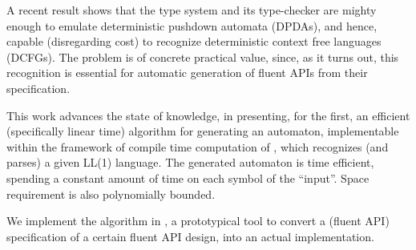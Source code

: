 
A recent result shows that the  type system and its type-checker are
mighty enough to emulate deterministic pushdown automata (DPDAs), and hence,
capable (disregarding cost) to recognize deterministic context free
languages (DCFGs). The problem is of concrete practical value, since, as it
turns out, this recognition is essential for automatic generation of fluent
APIs from their specification. 

This work advances the state of knowledge, in presenting,  for the first,  an
efficient (specifically linear time) algorithm for generating an automaton, 
implementable within the framework of compile time computation of , which
recognizes (and parses) a given LL(1) language. The generated automaton is 
time efficient, spending a constant amount of time on each symbol of the ``input''. 
Space requirement is also polynomially bounded. 

We implement the algorithm in \Fajita, a prototypical tool to convert a (fluent
API) specification of a certain fluent API design, into an actual implementation. 




